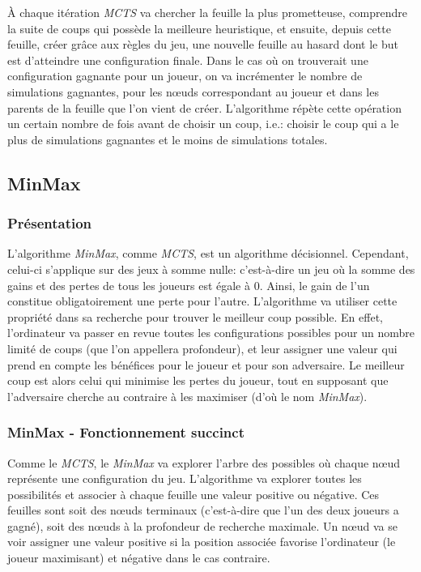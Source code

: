 À chaque itération \emph{MCTS} va chercher la feuille la plus prometteuse, comprendre la suite de coups qui possède la meilleure heuristique, 
et ensuite, depuis cette feuille, créer grâce aux règles du jeu, une nouvelle feuille au hasard dont le but est d'atteindre une configuration finale.
Dans le cas où on trouverait une configuration gagnante pour un joueur, on va incrémenter le nombre de simulations gagnantes, pour les nœuds
correspondant au joueur et dans les parents de la feuille que l'on vient de créer.
L'algorithme répète cette opération un certain nombre de fois avant de choisir un coup, i.e.: choisir le coup qui a le plus de simulations
gagnantes et le moins de simulations totales.



\subsection{MinMax}

\subsubsection{Présentation}
L'algorithme \emph{MinMax}, comme \emph{MCTS}, est un algorithme décisionnel. Cependant, celui-ci s'applique sur des jeux à somme nulle: c'est-à-dire
un jeu où la somme des gains et des pertes de tous les joueurs est égale à 0. Ainsi, le gain de l'un constitue 
obligatoirement une perte pour l'autre. L'algorithme va utiliser cette propriété dans sa recherche pour trouver le meilleur coup possible.
En effet, l'ordinateur va passer en revue toutes les configurations possibles pour un nombre limité de coups (que l'on appellera profondeur), 
et leur assigner une valeur qui prend en compte les bénéfices pour le joueur et pour son adversaire. Le meilleur coup est alors celui qui 
minimise les pertes du joueur, tout en supposant que l'adversaire cherche au contraire à les maximiser (d'où le nom \emph{MinMax}).

\subsubsection{MinMax - Fonctionnement succinct}
Comme le \emph{MCTS}, le \emph{MinMax} va explorer l'arbre des possibles où chaque nœud représente une configuration du jeu. 
L'algorithme va explorer toutes les possibilités et associer à chaque feuille une valeur positive ou négative. Ces feuilles sont
soit des nœuds terminaux (c'est-à-dire que l'un des deux joueurs a gagné), soit des nœuds à la profondeur de recherche maximale.
Un nœud va se voir assigner une valeur positive si la position associée favorise l'ordinateur (le joueur maximisant) 
et négative dans le cas contraire.

